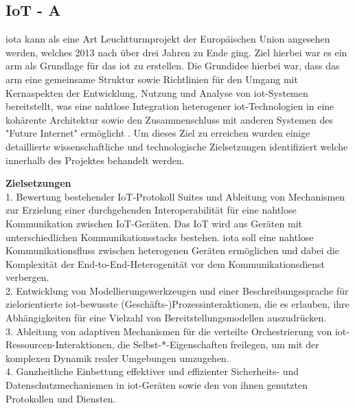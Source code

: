 \documentclass[a4paper, 12pt, twoside, headsepline=true]{scrartcl} %
\begin{document}
\subsection{IoT - A}

\acl{iota} kann als eine Art Leuchtturmprojekt der Europäischen Union angesehen werden, welches 2013 nach über drei Jahren zu Ende ging. Ziel hierbei war es ein \ac{arm} als Grundlage für das \ac{iot} zu erstellen. Die Grundidee hierbei war, dass das \ac{arm} eine gemeinsame Struktur sowie Richtlinien für den Umgang mit Kernaspekten der Entwicklung, Nutzung und Analyse von \ac{iot}-Systemen bereitstellt, was eine nahtlose Integration heterogener \ac{iot}-Technologien in eine kohärente Architektur sowie den Zusammenschluss mit anderen Systemen des "Future Internet" ermöglicht \cite[S.17]{enablingthingstotalk}. Um dieses Ziel zu erreichen wurden einige detaillierte wissenschaftliche und technologische Zielsetzungen identifiziert welche innerhalb des Projektes behandelt werden\cite{meetiot}.
\newline

\textbf{Zielsetzungen}
\\

1. Bewertung bestehender IoT-Protokoll Suites und Ableitung von Mechanismen zur Erzielung einer durchgehenden Interoperabilität für eine nahtlose Kommunikation zwischen IoT-Geräten. Das IoT wird aus Geräten mit unterschiedlichen Kommunikationsstacks bestehen. \ac{iota} soll eine nahtlose Kommunikationsfluss zwischen heterogenen Geräten ermöglichen und dabei die Komplexität der End-to-End-Heterogenität vor dem Kommunikationsdienst verbergen.
\\

2. Entwicklung von Modellierungswerkzeugen und einer Beschreibungssprache für zielorientierte \ac{iot}-bewusste (Geschäfts-)Prozessinteraktionen, die es erlauben, ihre Abhängigkeiten für eine Vielzahl von Bereitstellungsmodellen auszudrücken.
\\

3. Ableitung von adaptiven Mechanismen für die verteilte Orchestrierung von \ac{iot}-Ressourcen-Interaktionen, die Selbst-*-Eigenschaften freilegen, um mit der komplexen Dynamik realer Umgebungen umzugehen. 
\\

4. Ganzheitliche Einbettung effektiver und effizienter Sicherheits- und Datenschutzmechanismen in \ac{iot}-Geräten sowie den von ihnen genutzten Protokollen und Diensten.
\\
\end{document}
